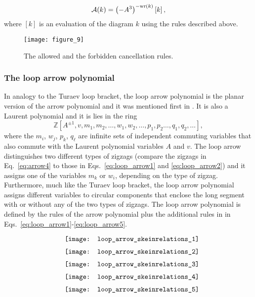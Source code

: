 \begin{equation}\label{eq:arrow}
\mathcal{A}(k) = \left( - A^3 \right )^{-{\rm wr}(k)} \left [ k  \right ],
\end{equation}
where $ \left [ k  \right ]$ is an evaluation of the diagram $k$ using the rules described above.
 \begin{figure}[h] 
\centering
\texttt{[image: figure\_9]}
\caption{\footnotesize The allowed and the forbidden cancellation rules.}\label{fig:cancel}
\end{figure}

\subsubsection{The loop arrow polynomial}

In analogy to the Turaev loop bracket, the loop arrow polynomial is the planar version of the arrow polynomial and it was mentioned first in \cite{gound2}. It is also a Laurent polynomial and it is lies in the ring 
\[
\mathbb{Z}[A^{\pm1}, v, m_1, m_2, \ldots, w_1, w_2, \ldots, p_1, p_2 \ldots, q_1, q_2, \ldots ],
\] where the $m_i$, $w_j$, $p_k$, $q_\ell$ are infinite sets of independent commuting variables that also commute with the
Laurent polynomial variables $A$ and $v$.  The loop arrow distinguishes two different types of zigzags (compare the zigzags in Eq.~\ref{eq:arrow4} to those in Eqs.~\ref{eq:loop_arrow1} and \ref{eq:loop_arrow2}) and it assigns one of the variables  $m_k$ or $w_i$, depending on the type of zigzag. Furthermore, much like the Turaev loop bracket, the loop arrow polynomial assigns different variables to circular components that enclose the long segment with or without any of the two types of zigzags. The loop arrow polynomial is defined by the rules of the arrow polynomial plus the additional rules in in Eqs.~\ref{eq:loop_arrow1}-\ref{eq:loop_arrow5}. 
\begin{eqnarray}
&&\raisebox{-0.5\height}{\texttt{[image: loop\_arrow\_skeinrelations\_1]}}\label{eq:loop_arrow1}\\
&&\raisebox{-0.5\height}{\texttt{[image: loop\_arrow\_skeinrelations\_2]}}\label{eq:loop_arrow2}\\
&&\raisebox{-0.5\height}{\texttt{[image: loop\_arrow\_skeinrelations\_3]}}\label{eq:loop_arrow3}\\
&&\raisebox{-0.5\height}{\texttt{[image: loop\_arrow\_skeinrelations\_4]}}\label{eq:loop_arrow4}\\
&&\raisebox{-0.5\height}{\texttt{[image: loop\_arrow\_skeinrelations\_5]}}\label{eq:loop_arrow5}
\end{eqnarray}

